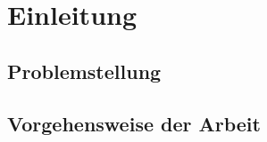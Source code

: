 \chapter{Einleitung}
\fancyhfStyleContent{}

\section{Problemstellung}

\section{Vorgehensweise der Arbeit}

